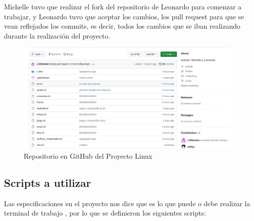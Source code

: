 \documentclass{article}
\begin{document}
Michelle tuvo que realizar el fork del repositorio de Leonardo para comenzar a trabajar, y Leonardo tuvo que aceptar los cambios, los pull request para que se vean reflejados los commits, es decir, todos los cambios que se iban realizando durante la realización del proyecto.

\begin{figure}[ht]
\centering
\includegraphics[width=1\textwidth]{cap1.png}
\caption{\label{fig:frog1}Repositorio en GitHub del Proyecto Linux}
\end{figure}

\subsection*{Scripts a utilizar}
Las especificaciones en el proyecto nos dice que es lo que puede o debe realizar la terminal de trabajo , por lo que se definieron los siguientes scripts:
\end{document}
